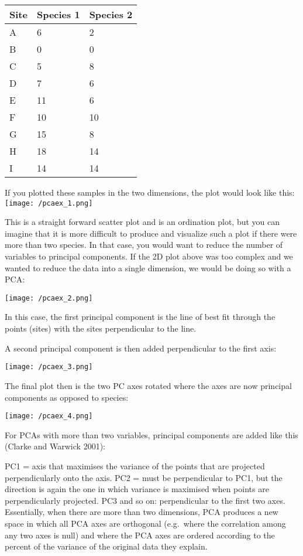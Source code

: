 \documentclass[
]{book}
\begin{document}
\begin{longtable}[]{@{}lll@{}}
\toprule
Site & Species 1 & Species 2\tabularnewline
\midrule
\endhead
A & 6 & 2\tabularnewline
B & 0 & 0\tabularnewline
C & 5 & 8\tabularnewline
D & 7 & 6\tabularnewline
E & 11 & 6\tabularnewline
F & 10 & 10\tabularnewline
G & 15 & 8\tabularnewline
H & 18 & 14\tabularnewline
I & 14 & 14\tabularnewline
\bottomrule
\end{longtable}

If you plotted these samples in the two dimensions, the plot would look
like this: \texttt{[image: /pcaex\_1.png]}

This is a straight forward scatter plot and is an ordination plot, but
you can imagine that it is more difficult to produce and visualize such
a plot if there were more than two species. In that case, you would want
to reduce the number of variables to principal components. If the 2D
plot above was too complex and we wanted to reduce the data into a
single dimension, we would be doing so with a PCA:

\texttt{[image: /pcaex\_2.png]}

In this case, the first principal component is the line of best fit
through the points (sites) with the sites perpendicular to the line.

A second principal component is then added perpendicular to the first
axis:

\texttt{[image: /pcaex\_3.png]}

The final plot then is the two PC axes rotated where the axes are now
principal components as opposed to species:

\texttt{[image: /pcaex\_4.png]}

For PCAs with more than two variables, principal components are added
like this (Clarke and Warwick 2001):

PC1 = axis that maximises the variance of the points that are projected
perpendicularly onto the axis. PC2 = must be perpendicular to PC1, but
the direction is again the one in which variance is maximised when
points are perpendicularly projected. PC3 and so on: perpendicular to
the first two axes. Essentially, when there are more than two
dimensions, PCA produces a new space in which all PCA axes are
orthogonal (e.g.~where the correlation among any two axes is null) and
where the PCA axes are ordered according to the percent of the variance
of the original data they explain.
\end{document}
